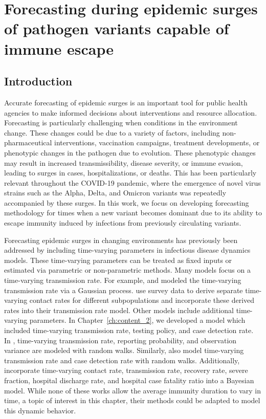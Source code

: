 \chapter{Forecasting during epidemic surges of pathogen variants capable of immune escape}
\graphicspath{{figures/ch_5/}}
\label{ch:content_3}

\section{Introduction}
\label{ch_5:sec:intro}

Accurate forecasting of epidemic surges is an important tool for public health agencies to make informed decisions about interventions and resource allocation.
Forecasting is particularly challenging when conditions in the environment change.
These changes could be due to a variety of factors, including non-pharmaceutical interventions, vaccination campaigns, treatment developments, or phenotypic changes in the pathogen due to evolution.
These phenotypic changes may result in increased transmissibility, disease severity, or immune evasion, leading to surges in cases, hospitalizations, or deaths.
This has been particularly relevant throughout the COVID-19 pandemic, where the emergence of novel virus strains such as the Alpha, Delta, and Omicron variants was repeatedly accompanied by these surges.
In this work, we focus on developing forecasting methodology for times when a new variant becomes dominant due to its ability to escape immunity induced by infections from previously circulating variants.

Forecasting epidemic surges in changing environments has previously been addressed by including time-varying parameters in infectious disease dynamics models.
These time-varying parameters can be treated as fixed inputs or estimated via parametric or non-parametric methods.
Many models focus on a time-varying transmission rate.
For example, \citet{Zhou2020Semiparametric} and \citet {Xiaoguang2018Bayesian} modeled the time-varying transmission rate via a Gaussian process.
\citet{Iyaniwura2022Mathematical} use survey data to derive separate time-varying contact rates for different subpopulations and incorporate these derived rates into their transmission rate model.
Other models include additional time-varying parameters.
In Chapter~\ref{ch:content_2}, we developed a model which included time-varying transmission rate, testing policy, and case detection rate.
In \citep{ODea2021semi}, time-varying transmission rate, reporting probability, and observation variance are modeled with random walks.
Similarly, \citet{Gibson2020real} also model time-varying transmission rate and case detection rate with random walks.
Additionally, \citet{morozova2021one} incorporate time-varying contact rate, transmission rate, recovery rate, severe fraction, hospital discharge rate, and hospital case fatality ratio into a Bayesian model.
While none of these works allow the average immunity duration to vary in time, a topic of interest in this chapter, their methods could be adapted to model this dynamic behavior.

